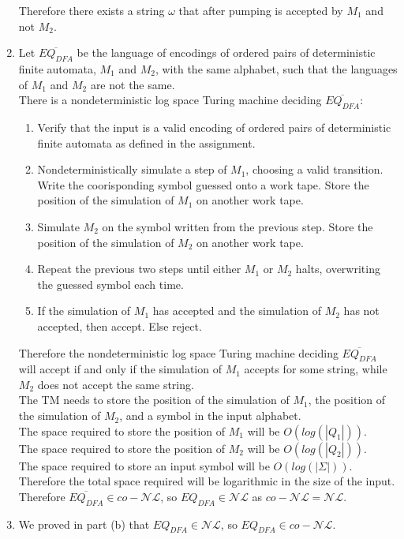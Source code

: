 \documentclass{assignment}
\begin{document}
\begin{problemlist}
\begin{answer}
\begin{enumerate}
  Therefore there exists a string $\omega$ that after pumping is accepted by $M_1$ and not $M_2$.\\
\item Let $\overline{EQ_{DFA}}$ be the language of encodings of ordered pairs of deterministic finite automata, $M_1$ and $M_2$, with the same alphabet, such that the languages of $M_1$ and $M_2$ are not the same.\\
  There is a nondeterministic log space Turing machine deciding $\overline{EQ_{DFA}}$:
  \begin{enumerate}
  \item Verify that the input is a valid encoding of ordered pairs of deterministic finite automata as defined in the assignment.
  \item Nondeterministically simulate a step of $M_1$, choosing a valid transition. Write the coorisponding symbol guessed onto a work tape. Store the position of the simulation of $M_1$ on another work tape.
  \item Simulate $M_2$ on the symbol written from the previous step. Store the position of the simulation of $M_2$ on another work tape.
  \item Repeat the previous two steps until either $M_1$ or $M_2$ halts, overwriting the guessed symbol each time.
  \item If the simulation of $M_1$ has accepted and the simulation of $M_2$ has not accepted, then accept. Else reject.
  \end{enumerate}
  Therefore the nondeterministic log space Turing machine deciding $\overline{EQ_{DFA}}$ will accept if and only if the simulation of $M_1$ accepts for some string, while $M_2$ does not accept the same string.\\
  The TM needs to store the position of the simulation of $M_1$, the position of the simulation of $M_2$, and a symbol in the input alphabet.\\
  The space required to store the position of $M_1$ will be $O(log(|Q_1|))$.\\
  The space required to store the position of $M_2$ will be $O(log(|Q_2|))$.\\
  The space required to store an input symbol will be $O(log(|\Sigma|))$.\\
  Therefore the total space required will be logarithmic in the size of the input.\\
  Therefore $\overline{EQ_{DFA}} \in co-\mathcal{NL}$, so $EQ_{DFA} \in \mathcal{NL}$ as $co-\mathcal{NL} = \mathcal{NL}$.
\item We proved in part (b) that $EQ_{DFA} \in \mathcal{NL}$, so $EQ_{DFA} \in co-\mathcal{NL}$.\\

\end{enumerate}
\end{answer}
\end{problemlist}
\end{document}
